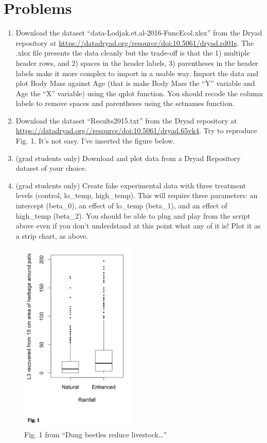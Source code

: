 \documentclass[]{book}
\theoremstyle{definition}
\theoremstyle{definition}
\theoremstyle{definition}
\theoremstyle{remark}
\begin{document}
\section{Problems}\label{problems}

\begin{enumerate}
\def\labelenumi{\arabic{enumi}.}
\item
  Download the dataset ``data-Lodjak.et.al-2016-FuncEcol.xlsx'' from the
  Dryad repository at
  \url{https://datadryad.org/resource/doi:10.5061/dryad.rd01s}. The
  .xlsx file presents the data cleanly but the trade-off is that the 1)
  multiple header rows, and 2) spaces in the header labels, 3)
  parentheses in the header labels make it more complex to import in a
  usable way. Import the data and plot Body Mass against Age (that is
  make Body Mass the ``Y'' variable and Age the ``X'' variable) using
  the qplot function. You should recode the column labels to remove
  spaces and parentheses using the setnames function.
\item
  Download the dataset ``Results2015.txt'' from the Dryad repository at
  \url{https://datadryad.org//resource/doi:10.5061/dryad.65vk4}. Try to
  reproduce Fig. 1. It's not easy. I've inserted the figure below.
\item
  (grad students only) Download and plot data from a Dryad Repository
  dataset of your choice.
\item
  (grad students only) Create fake experimental data with three
  treatment levels (control, lo\_temp, high\_temp). This will require
  three parameters: an intercept (beta\_0), an effect of lo\_temp
  (beta\_1), and an effect of high\_temp (beta\_2). You should be able
  to plug and play from the script above even if you don't underdstand
  at this point what any of it is! Plot it as a strip chart, as above.
\end{enumerate}

\begin{figure}
\centering
\includegraphics[width=0.50000\textwidth]{images/Dung_beetles_reduce_livestock-fig_1.png}
\caption{Fig. 1 from ``Dung beetles reduce livestock\ldots{}''}
\end{figure}
\end{document}
